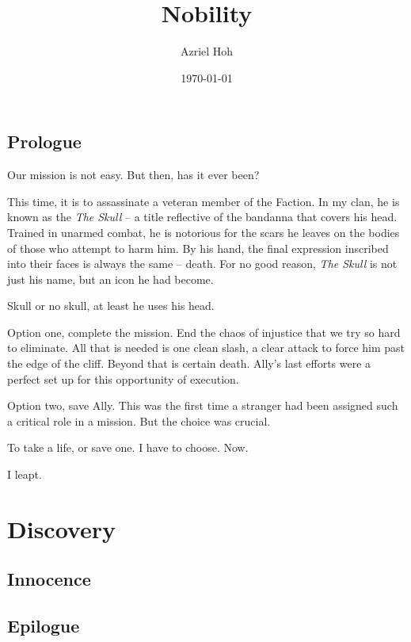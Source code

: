 \documentclass[11pt]{book}
\title{\bf Nobility}
\author{Azriel Hoh}
\date{\today}
\begin{document}
\frontmatter
\maketitle
\tableofcontents
\chapter{Prologue}
Our mission is not easy. But then, has it ever been?

This time, it is to assassinate a veteran member of the Faction. In my clan, he is known as the \textit{The Skull} -- a title reflective of
the bandanna that covers his head. Trained in unarmed combat, he is notorious for the scars he leaves on the bodies of those who attempt to
harm him. By his hand, the final expression inscribed into their faces is always the same -- death. For no good reason, \textit{The Skull}
is not just his name, but an icon he had become.

Skull or no skull, at least he uses his head.


Option one, complete the mission. End the chaos of injustice that we try so hard to eliminate. All that is needed is one clean slash, a
clear attack to force him past the edge of the cliff. Beyond that is certain death. Ally's last efforts were a perfect set up for this
opportunity of execution.

Option two, save Ally. This was the first time a stranger had been assigned such a critical role in a mission. But the choice was crucial.

To take a life, or save one. I have to choose. Now.

I leapt.

\mainmatter
\part{Discovery}
\chapter{Innocence}

\backmatter
\chapter{Epilogue}
\end{document}

